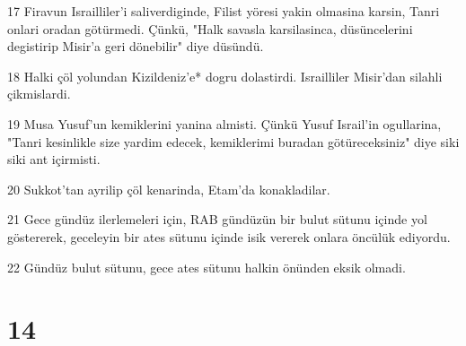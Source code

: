 \par 17 Firavun Israilliler'i saliverdiginde, Filist yöresi yakin olmasina karsin, Tanri onlari oradan götürmedi. Çünkü, "Halk savasla karsilasinca, düsüncelerini degistirip Misir'a geri dönebilir" diye düsündü.
\par 18 Halki çöl yolundan Kizildeniz'e* dogru dolastirdi. Israilliler Misir'dan silahli çikmislardi.
\par 19 Musa Yusuf'un kemiklerini yanina almisti. Çünkü Yusuf Israil'in ogullarina, "Tanri kesinlikle size yardim edecek, kemiklerimi buradan götüreceksiniz" diye siki siki ant içirmisti.
\par 20 Sukkot'tan ayrilip çöl kenarinda, Etam'da konakladilar.
\par 21 Gece gündüz ilerlemeleri için, RAB gündüzün bir bulut sütunu içinde yol göstererek, geceleyin bir ates sütunu içinde isik vererek onlara öncülük ediyordu.
\par 22 Gündüz bulut sütunu, gece ates sütunu halkin önünden eksik olmadi.

\chapter{14}

